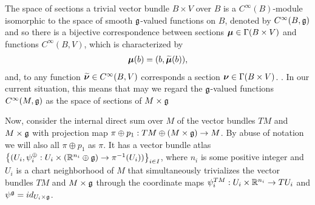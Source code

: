 The space of sections a trivial vector bundle $B \times V$ over $B$ is a $C^\infty(B)$-module isomorphic to the space of smooth $\mathfrak{g}$-valued functions on $B$, denoted by \emph{$C^\infty(B, \mathfrak{g})$} and so 
there is a bijective correspondence between sections $\bm{\mu} \in \Gamma(B \times V)$ and functions $C^\infty(B, V)$, which is characterized by
\begin{align} \label{defnTildeSect}
    \bm{\mu}(b) = (b, \widetilde{\bm{\mu}}(b)),
\end{align} and, to any function $\widetilde{\bm{\nu}} \in C^\infty(B, V)$ corresponds a section $\bm{\nu} \in \Gamma(B \times V)$. . In our current situation, this means that may we regard the $\mathfrak{g}$-valued functions $C^\infty(M, \mathfrak{g})$ as the space of sections of $M \times \mathfrak{g}$

Now, consider the internal direct sum over $M$ of the vector bundles $TM$ and $M \times \mathfrak{g}$ with projection map $\pi \oplus p_1: TM \oplus (M \times \mathfrak{g}) \to M$. By abuse of notation we will also all $\pi \oplus p_1$ as $\pi$. %
It has a vector bundle atlas $\left\{ (U_i, \psi^\oplus_i: U_i \times (\mathbb{R}^{n_i} \oplus \mathfrak{g}) \to \pi^{-1}(U_i) ) \right\}_{i \in I}$, where $n_i$ is some positive integer and $U_i$ is a chart neighborhood of $M$ that simultaneously trivializes the vector bundles $TM$ and $M \times \mathfrak{g}$ through the coordinate maps $\psi^{TM}_i: U_i \times \mathbb{R}^{n_i} \to TU_i$  and $\psi^{\mathfrak{g}} = id_{U_i \times \mathfrak{g}}$.

